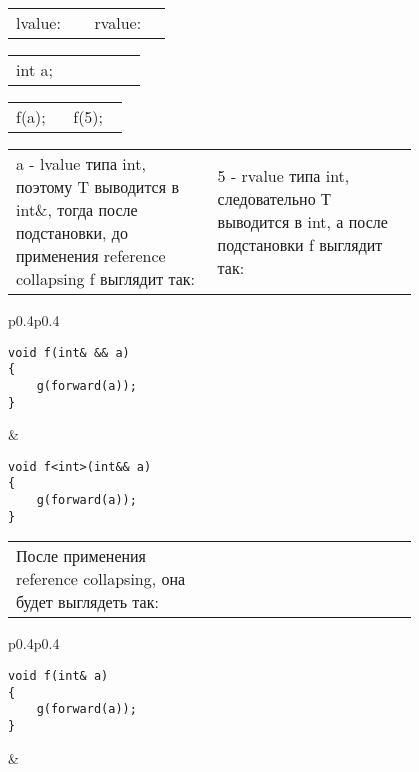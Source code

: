 \begin{center}
\begin{tabular}{p{0.4\linewidth}p{0.4\linewidth}}
lvalue: & rvalue:\\
\end{tabular}

\begin{tabular}{p{0.4\linewidth}p{0.4\linewidth}}
int a; & \vspace{\baselineskip}\\
\end{tabular}

\begin{tabular}{p{0.4\linewidth}p{0.4\linewidth}}
f(a); & f(5);\\
\end{tabular}

\begin{tabular}{p{0.4\linewidth}p{0.4\linewidth}}
a - lvalue типа int, поэтому T выводится в int\&, тогда после подстановки, до применения reference collapsing f выглядит так: & 5 - rvalue типа int, следовательно Т выводится в int, а после подстановки f выглядит так:\\
\end{tabular}

\begin{tabular}{p{0.4\linewidth}p{0.4\linewidth}}
\begin{verbatim}
void f(int& && a)
{
    g(forward(a));
}
\end{verbatim}
&
\begin{verbatim}
void f<int>(int&& a)
{
    g(forward(a));
}

\end{verbatim}
\end{tabular}

\begin{tabular}{p{0.4\linewidth}p{0.4\linewidth}}
После применения reference collapsing, она будет выглядеть так:
& \vspace{\baselineskip}\\
\end{tabular}

\begin{tabular}{p{0.4\linewidth}p{0.4\linewidth}}
\begin{verbatim}
void f(int& a)
{
    g(forward(a));
}
\end{verbatim}
& \vspace{\baselineskip}\\
\end{tabular}


\end{center}

